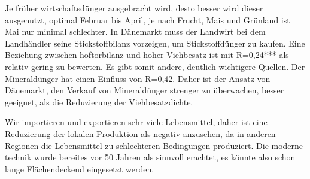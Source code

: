 \documentclass[11pt]{scrbook}
\begin{document}
Je früher wirtschaftsdünger ausgebracht wird, desto besser wird dieser ausgenutzt, optimal Februar bis April, je nach Frucht, Mais und Grünland ist Mai nur minimal schlechter.
In Dänemarkt muss der Landwirt bei dem Landhändler seine Stickstoffbilanz vorzeigen, um Stickstoffdünger zu kaufen.
Eine Beziehung zwischen hoftorbilanz und hoher Viehbesatz ist mit R=0,24*** als relativ gering zu bewerten.
Es gibt somit andere, deutlich wichtigere Quellen.
Der Mineraldünger hat einen Einfluss von R=0,42.
Daher ist der Ansatz von Dänemarkt, den Verkauf von Mineraldünger strenger zu überwachen, besser geeignet, als die Reduzierung der Viehbesatzdichte.


Wir importieren und exportieren sehr viele Lebensmittel, daher ist eine Reduzierung der lokalen Produktion als negativ anzusehen, da in anderen Regionen die Lebensmittel zu schlechteren Bedingungen produziert.
Die moderne technik wurde bereites vor 50 Jahren als sinnvoll erachtet, es könnte also schon lange Flächendeckend eingesetzt werden.

\end{document}
